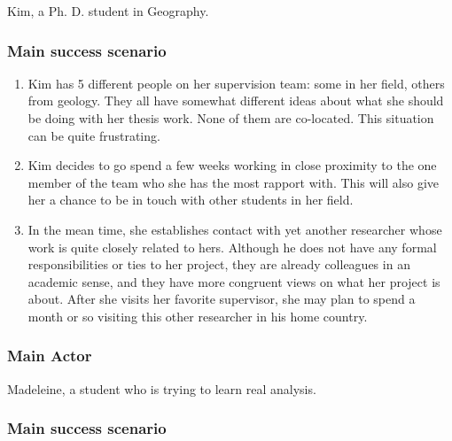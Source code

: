 Kim, a Ph. D. student in Geography.

\subsubsection{Main success scenario}

\begin{enumerate}
\item
  Kim has 5 different people on her supervision team: some in her field,
  others from geology. They all have somewhat different ideas about what
  she should be doing with her thesis work. None of them are co-located.
  This situation can be quite frustrating.
\item
  Kim decides to go spend a few weeks working in close proximity to the
  one member of the team who she has the most rapport with. This will
  also give her a chance to be in touch with other students in her
  field.
\item
  In the mean time, she establishes contact with yet another researcher
  whose work is quite closely related to hers. Although he does not have
  any formal responsibilities or ties to her project, they are already
  colleagues in an academic sense, and they have more congruent views on
  what her project is about. After she visits her favorite supervisor,
  she may plan to spend a month or so visiting this other researcher in
  his home country.
\end{enumerate}
\subsubsection{Main Actor}

Madeleine, a student who is trying to learn real analysis.

\subsubsection{Main success scenario}

